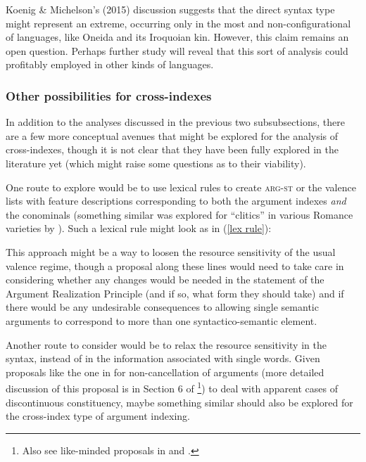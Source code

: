 \documentclass[output=paper
	        ,collection
	        ,collectionchapter
 	        ,biblatex
                ,babelshorthands
                ,newtxmath
                ,draftmode
                ,colorlinks, citecolor=brown
]{langscibook}
\begin{document}
Koenig \& Michelson's (2015) discussion suggests that the direct syntax type might represent an extreme, occurring only in the most  and non-configurational  of languages, like Oneida and its Iroquoian kin. However, this claim remains an open question. Perhaps further study will reveal that this sort of analysis could profitably employed in other kinds of languages.  

\subsubsection{Other possibilities for cross-indexes} \label{other poss for cross}

In addition to the analyses discussed in the previous two subsubsections, there are a few more conceptual avenues that might be explored for the analysis of cross-indexes, though it is not clear that they have been fully explored in the literature yet (which might raise some questions as to their viability). 

One route to explore would be to use lexical rules to create \textsc{arg-st} or the valence lists with feature descriptions corresponding to both the argument indexes \emph{and} the conominals (something similar was explored for ``clitics'' in various Romance varieties by \citealt{monachesi05}). Such a lexical rule might look as in (\ref{lex rule}):
%
\begin{exe}
\ex \label{lex rule}
\end{exe}
%
This approach might be a way to loosen the resource sensitivity of the usual valence regime, though a proposal along these lines would need to take care in considering whether any changes would be needed in the statement of the Argument Realization Principle (and if so, what form they should take) and if there would be any undesirable consequences to allowing single semantic arguments to correspond to more than one syntactico-semantic element.    

Another route to consider would be to relax the resource sensitivity in the syntax, instead of in the information associated with single words. Given proposals like the one in \citet{Bender2008a} for non-cancellation of arguments (more detailed discussion of this proposal is in Section 6 of \footnote{Also see like-minded proposals in \citet{Meurers99b} and \citet{Mueller2008a}.}) to deal with apparent cases of discontinuous constituency, maybe something similar should also be explored for the cross-index type of argument indexing. 
\end{document}
